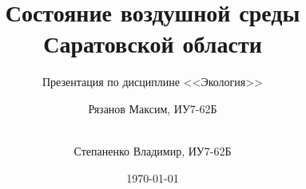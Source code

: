 
\title{Состояние воздушной среды \\ Саратовской области}
\subtitle{Презентация по дисциплине <<Экология>>}
\author{Рязанов Максим, ИУ7-62Б \and\\ Степаненко Владимир, ИУ7-62Б}
\date{\today}


\begin{frame}
  \maketitle
\end{frame}



